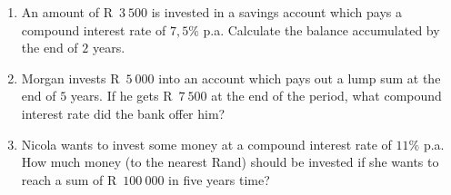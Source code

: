 \begin{exercises}{}{
    \begin{enumerate}[label=\textbf{\arabic*}.]
	\item An amount of R~$3~500$ is invested in a savings account which pays a compound interest rate of $7,5\%$ p.a. Calculate the balance accumulated by the end of $2$ years.
	\item Morgan invests R~$5~000$ into an account which pays out a lump sum at the end of $5$ years. If he gets R~$7~500$ at the end of the period, what compound interest rate did the bank offer him?
	\item Nicola wants to invest some money at a compound interest rate of $11\%$ p.a. How much money (to the nearest Rand) should be invested if she wants to reach a sum of R~$100~000$ in five years time?\\
    \end{enumerate}
}
\end{exercises}


